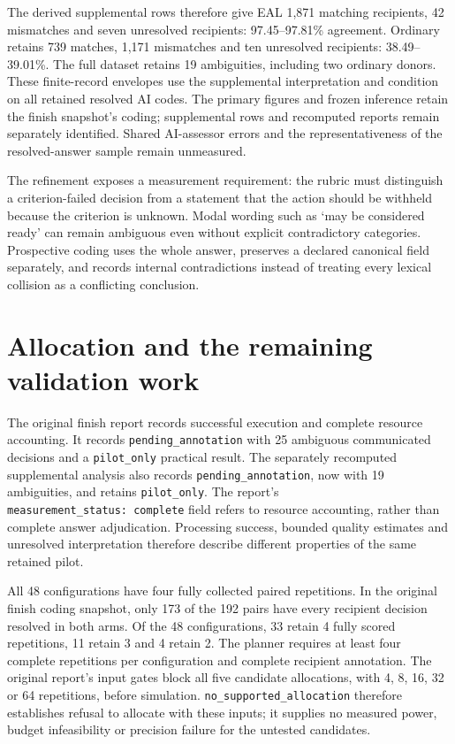 \documentclass[
  11pt,
]{article}
\begin{document}
The derived supplemental rows therefore give EAL 1,871 matching
recipients, 42 mismatches and seven unresolved recipients:
97.45--97.81\% agreement. Ordinary retains 739 matches, 1,171 mismatches
and ten unresolved recipients: 38.49--39.01\%. The full dataset retains
19 ambiguities, including two ordinary donors. These finite-record
envelopes use the supplemental interpretation and condition on all
retained resolved AI codes. The primary figures and frozen inference
retain the finish snapshot's coding; supplemental rows and recomputed
reports remain separately identified. Shared AI-assessor errors and the
representativeness of the resolved-answer sample remain unmeasured.

The refinement exposes a measurement requirement: the rubric must
distinguish a criterion-failed decision from a statement that the action
should be withheld because the criterion is unknown. Modal wording such
as `may be considered ready' can remain ambiguous even without explicit
contradictory categories. Prospective coding uses the whole answer,
preserves a declared canonical field separately, and records internal
contradictions instead of treating every lexical collision as a
conflicting conclusion.

\FloatBarrier

\hypertarget{allocation-and-the-remaining-validation-work}{%
\section{Allocation and the remaining validation
work}\label{allocation-and-the-remaining-validation-work}}

The original finish report records successful execution and complete
resource accounting. It records \texttt{pending\_annotation} with 25
ambiguous communicated decisions and a \texttt{pilot\_only} practical
result. The separately recomputed supplemental analysis also records
\texttt{pending\_annotation}, now with 19 ambiguities, and retains
\texttt{pilot\_only}. The report's
\texttt{measurement\_status:\ complete} field refers to resource
accounting, rather than complete answer adjudication. Processing
success, bounded quality estimates and unresolved interpretation
therefore describe different properties of the same retained pilot.

All 48 configurations have four fully collected paired repetitions. In
the original finish coding snapshot, only 173 of the 192 pairs have
every recipient decision resolved in both arms. Of the 48
configurations, 33 retain 4 fully scored repetitions, 11 retain 3 and 4
retain 2. The planner requires at least four complete repetitions per
configuration and complete recipient annotation. The original report's
input gates block all five candidate allocations, with 4, 8, 16, 32 or
64 repetitions, before simulation. \texttt{no\_supported\_allocation}
therefore establishes refusal to allocate with these inputs; it supplies
no measured power, budget infeasibility or precision failure for the
untested candidates.
\end{document}
